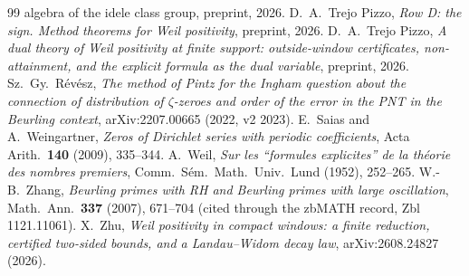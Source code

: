 \documentclass[11pt]{amsart}
\theoremstyle{definition}
\theoremstyle{remark}
\begin{document}
\begin{thebibliography}{99}
{algebra of the idele class group}, preprint, 2026.
 D.~A.~Trejo Pizzo, \emph{Row D: the sign. Method theorems for Weil positivity}, preprint, 2026.
 D.~A.~Trejo Pizzo, \emph{A dual theory of Weil positivity at finite support:
outside-window certificates, non-attainment, and the explicit formula as the dual variable}, preprint, 2026.
 Sz.~Gy.~R\'ev\'esz, \emph{The method of Pintz for the Ingham question about the connection of distribution of $\zeta$-zeroes and order of the error in the PNT in the Beurling context}, arXiv:2207.00665 (2022, v2 2023).
 E.~Saias and A.~Weingartner, \emph{Zeros of Dirichlet series with periodic coefficients}, Acta Arith.\ \textbf{140} (2009), 335--344. %
 A.~Weil, \emph{Sur les ``formules explicites'' de la th\'eorie des nombres
premiers}, Comm.~S\'em.~Math.~Univ.~Lund (1952), 252--265.
 W.-B.~Zhang, \emph{Beurling primes with RH and Beurling primes with large oscillation}, Math.~Ann.\ \textbf{337} (2007), 671--704 (cited through the zbMATH record, Zbl 1121.11061).
 X.~Zhu, \emph{Weil positivity in compact windows: a finite reduction, certified
two-sided bounds, and a Landau--Widom decay law}, arXiv:2608.24827 (2026).
\end{thebibliography}
\end{document}
